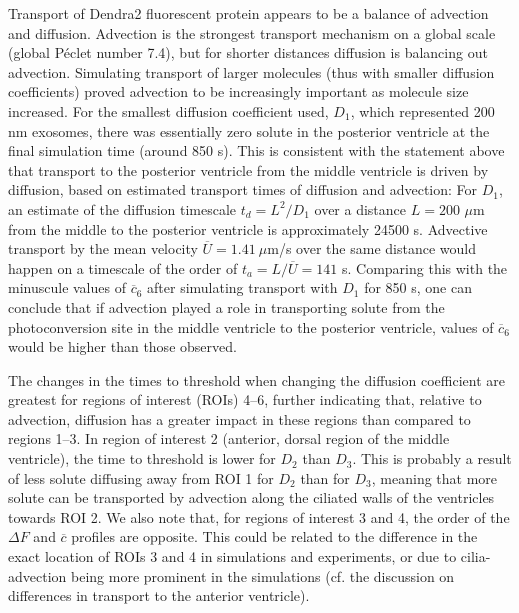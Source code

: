 \documentclass[fleqn]{wlscirep}
\begin{document}
Transport of Dendra2 fluorescent protein appears to be a balance of advection and diffusion. Advection is the strongest transport mechanism on a global scale (global Péclet number 7.4), but for shorter distances diffusion is balancing out advection. Simulating transport of larger molecules (thus with smaller diffusion coefficients) proved advection to be increasingly important as molecule size increased. For the smallest diffusion coefficient used, $D_1$, which represented 200 nm exosomes, there was essentially zero solute in the posterior ventricle at the final simulation time (around 850 s). This is consistent with the statement above that transport to the posterior ventricle from the middle ventricle is driven by diffusion, based on estimated transport times of diffusion and advection: For $D_1$, an estimate of the diffusion timescale $t_d=L^2/D_1$ over a distance $L=200$ $\mu$m from the middle to the posterior ventricle is approximately 24500 s. Advective transport by the mean velocity $\overline{U}=1.41 \ \mu$m/s over the same distance would happen on a timescale of the order of $t_a=L/\overline{U}=141$ s. Comparing this with the minuscule values of $\overline{c}_6$ after simulating transport with $D_1$ for 850 s, one can conclude that if advection played a role in transporting solute from the photoconversion site in the middle ventricle to the posterior ventricle, values of $\overline{c}_6$ would be higher than those observed.

The changes in the times to threshold when changing the diffusion coefficient are greatest for regions of interest (ROIs) 4--6, further indicating that, relative to advection, diffusion has a greater impact in these regions than compared to regions 1--3. In region of interest 2 (anterior, dorsal region of the middle ventricle), the time to threshold is lower for $D_2$ than $D_3$. This is probably a result of less solute diffusing away from ROI 1 for $D_2$ than for $D_3$, meaning that more solute can be transported by advection along the ciliated walls of the ventricles towards ROI 2. We also note that, for regions of interest 3 and 4, the order of the $\Delta F$ and $\overline{c}$ profiles are opposite. This could be related to the difference in the exact location of ROIs 3 and 4 in simulations and experiments, or due to cilia-advection being more prominent in the simulations (cf. the discussion on differences in transport to the anterior ventricle).
\end{document}
